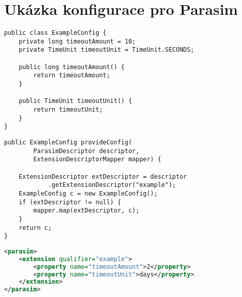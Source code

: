 \chapter{Ukázka konfigurace pro Parasim}\label{appendix:configuration}

\begin{lstlisting}[label={code:config:bean}, caption={Konfigurační třída}, style=Java]
public class ExampleConfig {
	private long timeoutAmount = 10;
	private TimeUnit timeoutUnit = TimeUnit.SECONDS;

	public long timeoutAmount() {
		return timeoutAmount;
	}

	public TimeUnit timeoutUnit() {
		return timeoutUnit;
	}
}
\end{lstlisting}

\begin{lstlisting}[style=Java, label={code:config:provide}, caption={Metoda poskytující konfiguraci}]
public ExampleConfig provideConfig(
		ParasimDescriptor descriptor,
		ExtensionDescriptorMapper mapper) {

	ExtensionDescriptor extDescriptor = descriptor
			.getExtensionDescriptor("example");
	ExampleConfig c = new ExampleConfig();
	if (extDescriptor != null) {
		mapper.map(extDescriptor, c);
	}
	return c;
}
\end{lstlisting}

\begin{lstlisting}[style=Java, language=xml, label={code:config:xml}, caption={parasim.xml}]
<parasim>
	<extension qualifier="example">
		<property name="timeoutAmount">2</property>
		<property name="timeoutUnit">days</property>
	</extension>
</parasim>
\end{lstlisting}
